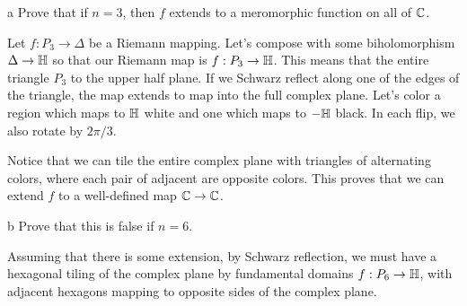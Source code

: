 \documentclass{pset}
\begin{document}
\begin{parts}
  \begin{part}{a}
    Prove that if $n=3$, then $f$ extends to a meromorphic function on all of $\mathbb{C}$.
  \end{part}

  Let $f : P_3 \to \Delta$ be a Riemann mapping. Let's compose with some biholomorphism $\Delta \to \mathbb{H}$ so that our Riemann map is $f : P_3 \to \mathbb{H}$. This means that the entire triangle $P_3$ to the upper half plane. If we Schwarz reflect along one of the edges of the triangle, the map extends to map into the full complex plane. Let's color a region which maps to $\mathbb{H}$ white and one which maps to $-\mathbb{H}$ black. In each flip, we also rotate by $2\pi/3$.

  \begin{center}
  \end{center}

  Notice that we can tile the entire complex plane with triangles of alternating colors, where each pair of adjacent are opposite colors. This proves that we can extend $f$ to a well-defined map $\mathbb{C} \to \mathbb{C}$.

  \begin{part}{b}
    Prove that this is false if $n=6$.
  \end{part}
  
  Assuming that there is some extension, by Schwarz reflection, we must have a hexagonal tiling of the complex plane by fundamental domains $f : P_6 \to \mathbb{H}$, with adjacent hexagons mapping to opposite sides of the complex plane.

  \begin{center}
\end{center}
\end{parts}
\end{document}
